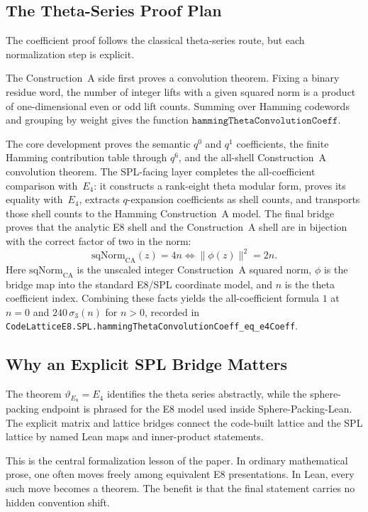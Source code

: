 \documentclass[12pt]{article}
\theoremstyle{definition}
\newcommand{\code}[1]{\texttt{#1}}
\newcommand{\lean}[1]{\texttt{#1}}
\newcommand{\Theta}{\vartheta}
\begin{document}
\subsection{The Theta-Series Proof Plan}

The coefficient proof follows the classical theta-series route, but each
normalization step is explicit.

The Construction~A side first proves a convolution theorem.  Fixing a binary
residue word, the number of integer lifts with a given squared norm is a
product of one-dimensional even or odd lift counts.  Summing over Hamming
codewords and grouping by weight gives the function
$\code{hammingThetaConvolutionCoeff}$.

The core development proves the semantic $q^0$ and $q^1$ coefficients, the finite
Hamming contribution table through $q^6$, and the all-shell
Construction~A convolution theorem.  The SPL-facing layer completes
the all-coefficient comparison with~$E_4$: it constructs a rank-eight theta
modular form, proves its equality with~$E_4$, extracts $q$-expansion
coefficients as shell counts, and transports those shell counts to the Hamming
Construction~A model.  The final bridge proves that the analytic E8 shell and
the Construction~A shell are in bijection with the correct factor of two in the
norm:
\[
  \mathrm{sqNorm}_{\mathrm{CA}}(z) = 4n \iff \|\phi(z)\|^2 = 2n.
\]
Here \(\mathrm{sqNorm}_{\mathrm{CA}}\) is the unscaled integer Construction~A
squared norm, \(\phi\) is the bridge map into the standard E8/SPL coordinate
model, and \(n\) is the theta coefficient index.
Combining these facts yields the all-coefficient formula $1$ at $n=0$ and
$240\,\sigma_3(n)$ for $n>0$, recorded in
\lean{CodeLatticeE8.SPL.hammingThetaConvolutionCoeff\_eq\_e4Coeff}.

\subsection{Why an Explicit SPL Bridge Matters}

The theorem $\Theta_{E_8} = E_4$ identifies the theta series abstractly, while
the sphere-packing endpoint is phrased for the E8 model used inside
Sphere-Packing-Lean.  The explicit matrix and lattice bridges connect the
code-built lattice and the SPL lattice by named Lean maps and inner-product
statements.

This is the central formalization lesson of the paper.  In ordinary
mathematical prose, one often moves freely among equivalent E8 presentations.
In Lean, every such move becomes a theorem.  The benefit is that the final
statement carries no hidden convention shift.
\end{document}
